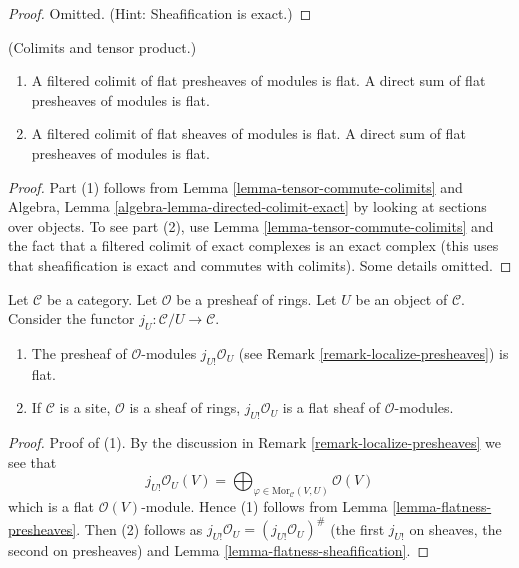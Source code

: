 \begin{proof}
Omitted. (Hint: Sheafification is exact.)
\end{proof}

\begin{lemma}
\label{lemma-colimits-flat}
(Colimits and tensor product.)
\begin{enumerate}
\item A filtered colimit of flat presheaves of modules
is flat. A direct sum of flat presheaves of modules is flat.
\item A filtered colimit of flat sheaves of modules is flat.
A direct sum of flat presheaves of modules is flat.
\end{enumerate}
\end{lemma}

\begin{proof}
Part (1) follows from Lemma \ref{lemma-tensor-commute-colimits} and
Algebra, Lemma \ref{algebra-lemma-directed-colimit-exact}
by looking at sections over objects.
To see part (2), use Lemma \ref{lemma-tensor-commute-colimits} and
the fact that a filtered colimit of exact 
complexes is an exact complex (this uses that sheafification is exact
and commutes with colimits). Some details omitted.
\end{proof}

\begin{lemma}
\label{lemma-j-shriek-flat}
Let $\mathcal{C}$ be a category.
Let $\mathcal{O}$ be a presheaf of rings.
Let $U$ be an object of $\mathcal{C}$.
Consider the functor $j_U : \mathcal{C}/U \to \mathcal{C}$.
\begin{enumerate}
\item The presheaf of $\mathcal{O}$-modules
$j_{U!}\mathcal{O}_U$ (see
Remark \ref{remark-localize-presheaves})
is flat.
\item If $\mathcal{C}$ is a site, $\mathcal{O}$ is a sheaf of rings,
$j_{U!}\mathcal{O}_U$ is a flat sheaf of $\mathcal{O}$-modules.
\end{enumerate}
\end{lemma}

\begin{proof}
Proof of (1). By the discussion in
Remark \ref{remark-localize-presheaves}
we see that
$$
j_{U!}\mathcal{O}_U(V)
=
\bigoplus\nolimits_{\varphi \in \text{Mor}_{\mathcal{C}}(V, U)}
\mathcal{O}(V)
$$
which is a flat $\mathcal{O}(V)$-module. Hence (1) follows from
Lemma \ref{lemma-flatness-presheaves}.
Then (2) follows as $j_{U!}\mathcal{O}_U = (j_{U!}\mathcal{O}_U)^\#$
(the first $j_{U!}$ on sheaves, the second on presheaves)
and Lemma \ref{lemma-flatness-sheafification}.
\end{proof}

